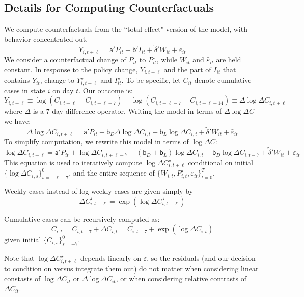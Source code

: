 \documentclass[3p, longtitle]{elsarticle}
\theoremstyle{definition}
\begin{document}
\subsection{Details for Computing Counterfactuals \label{app:counterfactuals}}

We compute counterfactuals from the ``total effect" version of the
model, with behavior concentrated out.
$$
Y_{i,t+\ell}
= \mathsf{a}'
P_{it} + \mathsf{b}' I_{it} +  {\tilde {\delta}}' W_{it}   + {\bar \varepsilon}_{it}
$$
We consider a counterfactual change of $P_{it}$ to $P_{it}^\star$, while
$W_{it}$ and $\bar \varepsilon_{it}$ are held constant. In response to
the policy change, $Y_{i,t+\ell}$ and the part of $I_{it}$ that
contains $Y_{it}$, change to $Y_{i,t+\ell}^\star$ and $I_{it}^\star$. To be
specific, let $C_{it}$ denote cumulative cases in state $i$ on day
$t$. Our outcome is:
$$
Y_{i,t+\ell} \equiv \log
\left(C_{i, t+\ell} - C_{i, t + \ell - 7} \right) - \log
\left(C_{i, t+\ell-7} - C_{i, t + \ell - 14} \right) \equiv \Delta
\log \Delta C_{i,t+\ell}
$$
where $\Delta$ is a 7 day difference operator. Writing the model in
terms of $\Delta \log \Delta C$ we have:
$$
\Delta \log \Delta C_{i,t+\ell} = \mathsf{a}' P_{it} + \mathsf{b}_D
\Delta \log \Delta C_{i,t} + \mathsf{b}_L \log \Delta C_{i,t} +
{\tilde {\delta}}' W_{it}   + {\bar \varepsilon}_{it}
$$
To simplify computation, we rewrite this model in terms of $\log
\Delta C$:
$$
\log \Delta C_{i,t+\ell} = \mathsf{a}' P_{it} + \log \Delta
C_{i,t+\ell-7} + (\mathsf{b}_D + \mathsf{b}_L) \log \Delta C_{i,t} -
\mathsf{b}_D \log \Delta C_{i,t-7} + {\tilde {\delta}}' W_{it}   + {\bar \varepsilon}_{it}
$$
This equation is used to iteratively compute
$\log \Delta C_{i,t+\ell}^\star$
conditional on initial $\{\log \Delta C_{i,s}\}_{s=-\ell-7}^{0}$,
and the entire sequence of $\{W_{i,t}, P_{i,t}^\star, \bar \varepsilon_{it} \}_{t=0}^T$.

Weekly cases instead of log weekly cases are given simply by
$$ \Delta C_{i,t+\ell}^\star = \exp(\log \Delta C_{i,t+\ell}^\star)$$

Cumulative cases can be recursively computed as:
$$
  C_{i,t} = C_{i,t-7} + \Delta C_{i,t} = C_{i,t-7} + \exp(\log \Delta C_{i,t})
$$
given initial $\{C_{i,s}\}_{s=-7}^0$.

Note that $\log \Delta C_{i,t+\ell}^\star$ depends linearly on
$\bar \varepsilon$, so the residuals (and our decision to condition on
versus integrate them out) do not matter when considering linear
constasts of $\log \Delta C_{it}$ or $\Delta \log \Delta C_{it}$, or
when considering relative contrasts of $\Delta C_{it}$.
\end{document}
